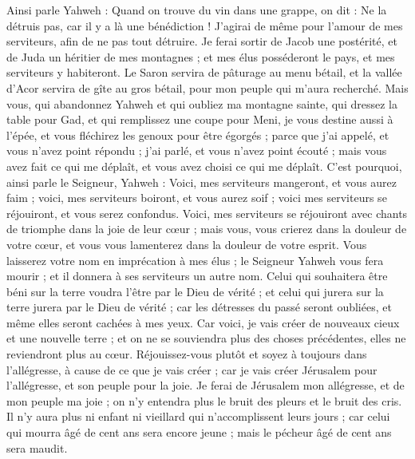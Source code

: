 \begin{multicols}{2}
Ainsi parle Yahweh : Quand on trouve du vin dans une grappe, on dit : Ne la détruis pas, car il y a là une bénédiction ! J'agirai de même pour l'amour de mes serviteurs, afin de ne pas tout détruire.
Je ferai sortir de Jacob une postérité, et de Juda un héritier de mes montagnes ; et mes élus posséderont le pays, et mes serviteurs y habiteront.
Le Saron servira de pâturage au menu bétail, et la vallée d'Acor servira de gîte au gros bétail, pour mon peuple qui m'aura recherché.
Mais vous, qui abandonnez Yahweh et qui oubliez ma montagne sainte, qui dressez la table pour Gad, et qui remplissez une coupe pour Meni,
je vous destine aussi à l'épée, et vous fléchirez les genoux pour être égorgés ; parce que j'ai appelé, et vous n'avez point répondu ; j'ai parlé, et vous n'avez point écouté ; mais vous avez fait ce qui me déplaît, et vous avez choisi ce qui me déplaît.
C'est pourquoi, ainsi parle le Seigneur, Yahweh : Voici, mes serviteurs mangeront, et vous aurez faim ; voici, mes serviteurs boiront, et vous aurez soif ; voici mes serviteurs se réjouiront, et vous serez confondus.
Voici, mes serviteurs se réjouiront avec chants de triomphe dans la joie de leur cœur ; mais vous, vous crierez dans la douleur de votre cœur, et vous vous lamenterez dans la douleur de votre esprit.
Vous laisserez votre nom en imprécation à mes élus ; le Seigneur Yahweh vous fera mourir ; et il donnera à ses serviteurs un autre nom.
Celui qui souhaitera être béni sur la terre voudra l'être par le Dieu de vérité ; et celui qui jurera sur la terre jurera par le Dieu de vérité ; car les détresses du passé seront oubliées, et même elles seront cachées à mes yeux.
Car voici, je vais créer de nouveaux cieux et une nouvelle terre ; et on ne se souviendra plus des choses précédentes, elles ne reviendront plus au cœur.
Réjouissez-vous plutôt et soyez à toujours dans l'allégresse, à cause de ce que je vais créer ; car je vais créer Jérusalem pour l'allégresse, et son peuple pour la joie.
Je ferai de Jérusalem mon allégresse, et de mon peuple ma joie ; on n'y entendra plus le bruit des pleurs et le bruit des cris.
Il n'y aura plus ni enfant ni vieillard qui n'accomplissent leurs jours ; car celui qui mourra âgé de cent ans sera encore jeune ; mais le pécheur âgé de cent ans sera maudit.

\end{multicols}
